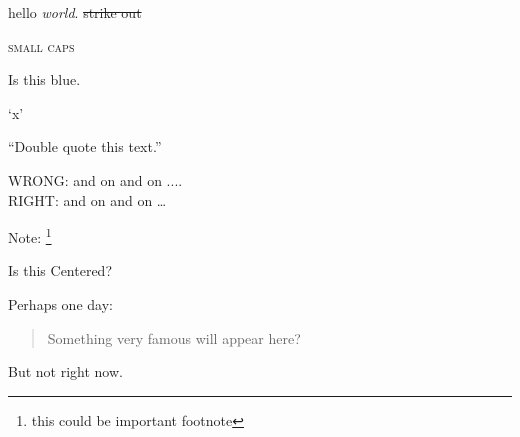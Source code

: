 \documentclass{article}
\begin{document}
hello \emph{world}.
\sout{strike out}

\textsc{small caps}

\color{blue}   Is this blue.




`x'

``Double quote this text.''

WRONG:   and on and on .... \\

RIGHT:   and on and on \ldots





Note: \footnote{this could be important footnote}


\begin{center}
    Is this Centered?
\end{center}



Perhaps one day:

\begin{quote}
    \footnotesize{Something very famous will appear here?}
\end{quote}

But not right now.
\end{document}
